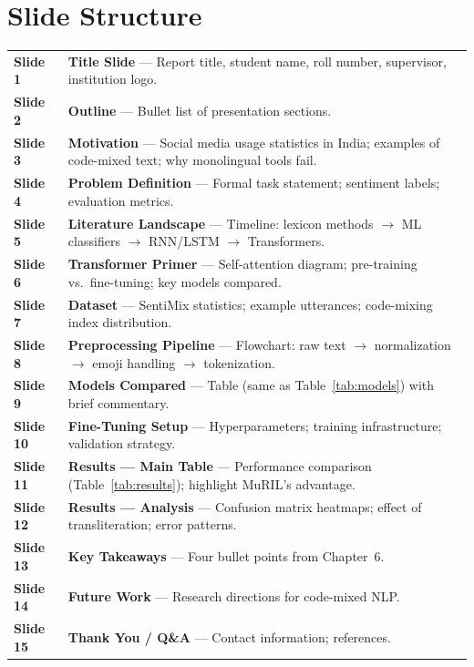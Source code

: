 \section*{Slide Structure}

\renewcommand{\arraystretch}{1.3}
\begin{tabularx}{\linewidth}{@{}>{\color{accent}\bfseries}l@{\hspace{8mm}}>{\raggedright\arraybackslash}X@{}}
Slide 1  & \textbf{Title Slide} — Report title, student name, roll number, supervisor, institution logo. \\
Slide 2  & \textbf{Outline} — Bullet list of presentation sections. \\
Slide 3  & \textbf{Motivation} — Social media usage statistics in India; examples of code-mixed text; why monolingual tools fail. \\
Slide 4  & \textbf{Problem Definition} — Formal task statement; sentiment labels; evaluation metrics. \\
Slide 5  & \textbf{Literature Landscape} — Timeline: lexicon methods $\rightarrow$ ML classifiers $\rightarrow$ RNN/LSTM $\rightarrow$ Transformers. \\
Slide 6  & \textbf{Transformer Primer} — Self-attention diagram; pre-training vs.\ fine-tuning; key models compared. \\
Slide 7  & \textbf{Dataset} — SentiMix statistics; example utterances; code-mixing index distribution. \\
Slide 8  & \textbf{Preprocessing Pipeline} — Flowchart: raw text $\rightarrow$ normalization $\rightarrow$ emoji handling $\rightarrow$ tokenization. \\
Slide 9  & \textbf{Models Compared} — Table (same as Table~\ref{tab:models}) with brief commentary. \\
Slide 10 & \textbf{Fine-Tuning Setup} — Hyperparameters; training infrastructure; validation strategy. \\
Slide 11 & \textbf{Results — Main Table} — Performance comparison (Table~\ref{tab:results}); highlight MuRIL's advantage. \\
Slide 12 & \textbf{Results — Analysis} — Confusion matrix heatmaps; effect of transliteration; error patterns. \\
Slide 13 & \textbf{Key Takeaways} — Four bullet points from Chapter~6. \\
Slide 14 & \textbf{Future Work} — Research directions for code-mixed NLP. \\
Slide 15 & \textbf{Thank You / Q\&A} — Contact information; references.
\end{tabularx}
